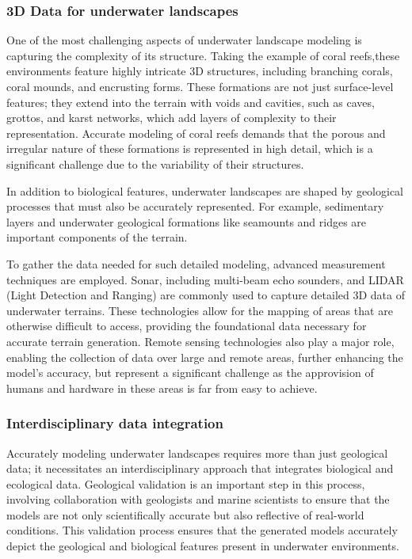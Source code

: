 \subsubsection{3D Data for underwater landscapes}

One of the most challenging aspects of underwater landscape modeling is capturing the complexity of its structure. Taking the example of coral reefs,these environments feature highly intricate 3D structures, including branching corals, coral mounds, and encrusting forms. These formations are not just surface-level features; they extend into the terrain with voids and cavities, such as caves, grottos, and karst networks, which add layers of complexity to their representation. Accurate modeling of coral reefs demands that the porous and irregular nature of these formations is represented in high detail, which is a significant challenge due to the variability of their structures.

In addition to biological features, underwater landscapes are shaped by geological processes that must also be accurately represented. For example, sedimentary layers and underwater geological formations like seamounts and ridges are important components of the terrain. 

To gather the data needed for such detailed modeling, advanced measurement techniques are employed. Sonar, including multi-beam echo sounders, and LIDAR (Light Detection and Ranging) are commonly used to capture detailed 3D data of underwater terrains. These technologies allow for the mapping of areas that are otherwise difficult to access, providing the foundational data necessary for accurate terrain generation. Remote sensing technologies also play a major role, enabling the collection of data over large and remote areas, further enhancing the model's accuracy, but represent a significant challenge as the approvision of humans and hardware in these areas is far from easy to achieve.

\subsubsection{Interdisciplinary data integration}

Accurately modeling underwater landscapes requires more than just geological data; it necessitates an interdisciplinary approach that integrates biological and ecological data. Geological validation is an important step in this process, involving collaboration with geologists and marine scientists to ensure that the models are not only scientifically accurate but also reflective of real-world conditions. This validation process ensures that the generated models accurately depict the geological and biological features present in underwater environments.

